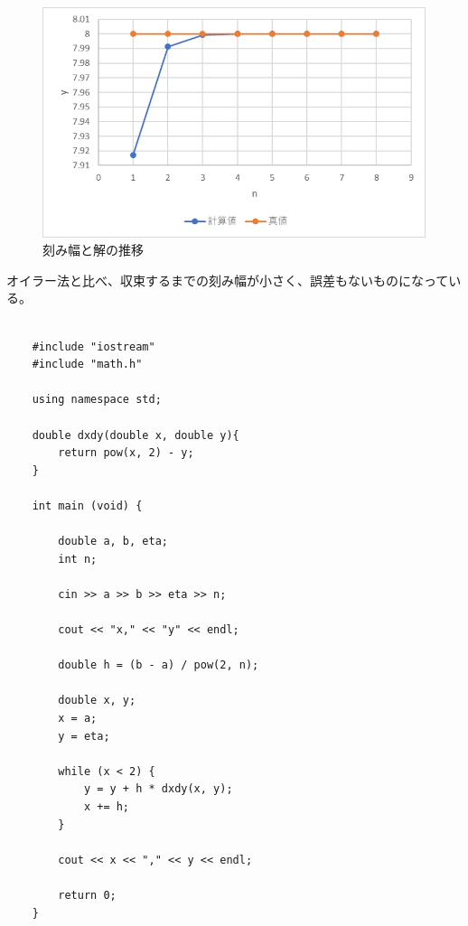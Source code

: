 \documentclass[a4paper,11pt]{jsarticle}
\begin{document}
  \begin{figure}[h]
    \centering
    \includegraphics[scale=0.75]{5}
    \caption{刻み幅と解の推移}
    \label{fig:5}
  \end{figure}

  オイラー法と比べ、収束するまでの刻み幅が小さく、誤差もないものになっている。
        
  \begin{lstlisting}[caption=Euler.cpp]

    #include "iostream"
    #include "math.h"
    
    using namespace std;
    
    double dxdy(double x, double y){
        return pow(x, 2) - y;
    }
    
    int main (void) {
        
        double a, b, eta;
        int n;
    
        cin >> a >> b >> eta >> n;
    
        cout << "x," << "y" << endl;
    
        double h = (b - a) / pow(2, n);
    
        double x, y;
        x = a;
        y = eta;
    
        while (x < 2) {
            y = y + h * dxdy(x, y);
            x += h;
        }
    
        cout << x << "," << y << endl;
    
        return 0;
    }

  \end{lstlisting}
\end{document}
